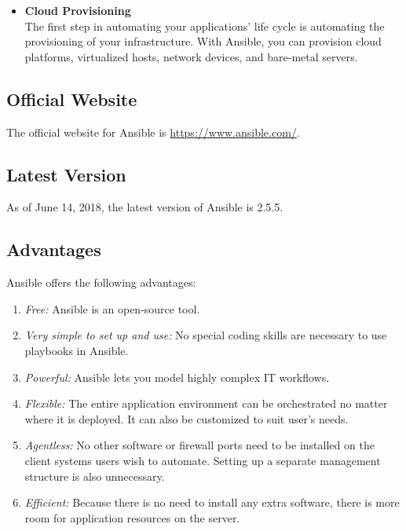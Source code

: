 \documentclass[a4paper, 12pt]{article}
\begin{document}
\begin{itemize}
\item
\textbf{Cloud Provisioning}\\
The first step in automating your applications' life cycle is automating the provisioning of your infrastructure. With Ansible, you can provision cloud platforms, virtualized hosts, network devices, and bare-metal servers.
\end{itemize}

\subsection{Official Website}
The official website for Ansible is \href{https://www.ansible.com/}{https://www.ansible.com/}.
\subsection{Latest Version}
As of June 14, 2018, the latest version of Ansible is 2.5.5.
\subsection{Advantages}
Ansible offers the following advantages:
\begin{enumerate}
\item
\textit{Free:} Ansible is an open-source tool.
\item
\textit{Very simple to set up and use:} No special coding skills are necessary to use playbooks in Ansible.
\item
\textit{Powerful:} Ansible lets you model highly complex IT workflows.
\item
\textit{Flexible:} The entire application environment can be orchestrated no matter where it is deployed. It can also be customized to suit user's needs.
\item
\textit{Agentless:} No other software or firewall ports need to be installed on the client systems users wish to automate. Setting up a separate management structure is also unnecessary. 
\item
\textit{Efficient:} Because there is no need to install any extra software, there is more room for application resources on the server.
\end{enumerate}
\end{document}
